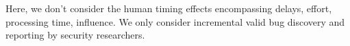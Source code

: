 
Here, we don't consider the human timing effects encompassing delays, effort, processing time, influence. We only consider incremental valid bug discovery and reporting by security researchers.


